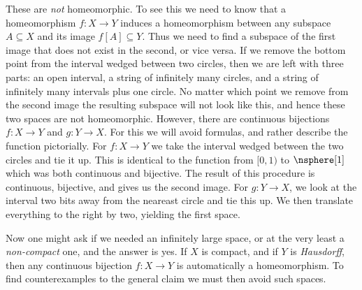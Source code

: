 \documentclass{book}                                                           %
\begin{document}
                These are \textit{not} homeomorphic. To see this we need to know
                that a homeomorphism $f:X\rightarrow{Y}$ induces a
                homeomorphism between any subspace $A\subseteq{X}$ and its image
                $f[A]\subseteq{Y}$. Thus we need to find a subspace of the first
                image that does not exist in the second, or vice versa. If we
                remove the bottom point from the interval wedged between two
                circles, then we are left with three parts: an open interval,
                a string of infinitely many circles, and a string of infinitely
                many intervals plus one circle. No matter which point we remove
                from the second image the resulting subspace will not look like
                this, and hence these two spaces are not homeomorphic. However,
                there are continuous bijections $f:X\rightarrow{Y}$ and
                $g:Y\rightarrow{X}$. For this we will avoid formulas, and rather
                describe the function pictorially. For $f:X\rightarrow{Y}$ we
                take the interval wedged between the two circles and tie it up.
                This is identical to the function from $[0,1)$ to $\nsphere[1]$
                which was both continuous and bijective. The result of this
                procedure is continuous, bijective, and gives us the second
                image. For $g:Y\rightarrow{X}$, we look at the interval two bits
                away from the neareast circle and tie this up. We then translate
                everything to the right by two, yielding the first space.
                \par\hfill\par
                Now one might ask if we needed an infinitely large space, or at
                the very least a \textit{non-compact} one, and the answer is
                yes. If $X$ is compact, and if $Y$ is \textit{Hausdorff}, then
                any continuous bijection $f:X\rightarrow{Y}$ is automatically a
                homeomorphism. To find counterexamples to the general claim we
                must then avoid such spaces.
\end{document}

